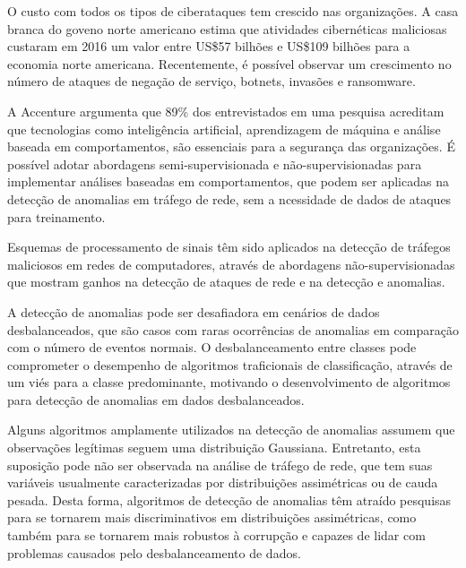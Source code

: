 
O custo com todos os tipos de ciberataques tem crescido nas organizações. A casa branca do goveno norte americano estima que atividades cibernéticas maliciosas custaram em 2016 um valor entre US\$57 bilhões e US\$109 bilhões para a economia norte americana. Recentemente, é possível observar um crescimento no número de ataques de negação de serviço, botnets, invasões e ransomware.

A Accenture argumenta que 89\% dos entrevistados em uma pesquisa acreditam que tecnologias como inteligência artificial, aprendizagem de máquina e análise baseada em comportamentos, são essenciais para a segurança das organizações. É possível adotar abordagens semi-supervisionada e não-supervisionadas para implementar análises baseadas em comportamentos, que podem ser aplicadas na detecção de anomalias em tráfego de rede, sem a ncessidade de dados de ataques para treinamento.

Esquemas de processamento de sinais têm sido aplicados na detecção de tráfegos maliciosos em redes de computadores, através de abordagens não-supervisionadas que mostram ganhos na detecção de ataques de rede e na detecção e anomalias. 

A detecção de anomalias pode ser desafiadora em cenários de dados desbalanceados, que são casos com raras ocorrências de anomalias em comparação com o número de eventos normais. O desbalanceamento entre classes pode comprometer o desempenho de algoritmos traficionais de classificação, através de um viés para a classe predominante, motivando o desenvolvimento de algoritmos para detecção de anomalias em dados desbalanceados.

Alguns algoritmos amplamente utilizados na detecção de anomalias assumem que observações legítimas seguem uma distribuição Gaussiana. Entretanto, esta suposição pode não ser observada na análise de tráfego de rede, que tem suas variáveis usualmente caracterizadas por distribuições assimétricas
ou de cauda pesada. Desta forma, algoritmos de detecção de anomalias têm atraído pesquisas para se tornarem mais discriminativos em distribuições assimétricas, como também para se tornarem mais robustos à corrupção e capazes de lidar com problemas causados pelo desbalanceamento de dados.

